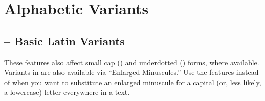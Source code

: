 \section{Alphabetic Variants}
\subsection{ -- Basic Latin Variants}
These features also affect small cap () and underdotted () forms,
where available. Variants in  are also available via  “Enlarged Minuscules.”
Use the  features instead of  when you want to substitute an
enlarged minuscule for a capital (or, less likely, a lowercase) letter everywhere in a text.

